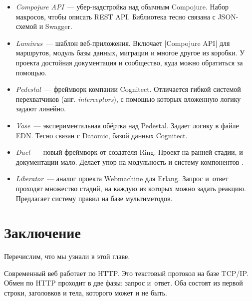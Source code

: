 \begin{itemize}

\item
  \emph{Compojure API}~---
  убер-надстройка над обычным Compojure. Набор макросов, чтобы описать REST
  API. Библиотека тесно связана с JSON-схемой и Swagger.

\item
  \emph{Luminus}~--- шаблон
  веб-приложения. Включает \spverb|Compojure API| для маршрутов, модуль базы
  данных, миграции и многое другое из коробки. У проекта достойная документация
  и сообщество, куда можно обратиться за помощью.

\item
  \emph{Pedestal}~--- фреймворк
  компании Cognitect. Отличается гибкой системой перехватчиков
  (анг. \emph{interceptors}), с помощью которых вложенную логику задают линейно.

\item
  \emph{Vase}~---
  экспериментальная об\"{е}ртка над Pedestal. Задает логику в файле EDN. Тесно
  связан с Datomic, базой данных Cognitect.

\item
  \emph{Duct}~--- новый
  фреймворк от создателя Ring. Проект на ранней стадии, и документации
  мало. Делает упор на модульность и систему компонентов .

\item
  \emph{Liberator}~---
  аналог проекта Webmachine для Erlang. Запрос и~ответ проходят множество
  стадий, на каждую из которых можно задать реакцию. Предлагает систему правил
  на базе мультиметодов.

\end{itemize}

\section{Заключение}

Перечислим, что мы узнали в этой главе.

Современный веб работает по HTTP. Это текстовый протокол на базе TCP/IP. Обмен
по HTTP проходит в две фазы: запрос и~ответ. Оба состоят из первой строки,
заголовков и тела, которого может и не быть.

